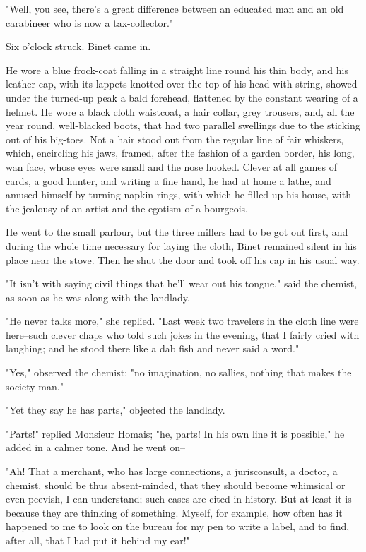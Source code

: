 \documentclass[11pt,twocolumn]{ltugboat}
\begin{document}
"Well, you see, there's a great difference between an educated man and
an old carabineer who is now a tax-collector."

Six o'clock struck. Binet came in.

He wore a blue frock-coat falling in a straight line round his thin
body, and his leather cap, with its lappets knotted over the top of
his head with string, showed under the turned-up peak a bald forehead,
flattened by the constant wearing of a helmet. He wore a black cloth
waistcoat, a hair collar, grey trousers, and, all the year round,
well-blacked boots, that had two parallel swellings due to the sticking
out of his big-toes. Not a hair stood out from the regular line of fair
whiskers, which, encircling his jaws, framed, after the fashion of a
garden border, his long, wan face, whose eyes were small and the nose
hooked. Clever at all games of cards, a good hunter, and writing a
fine hand, he had at home a lathe, and amused himself by turning napkin
rings, with which he filled up his house, with the jealousy of an artist
and the egotism of a bourgeois.

He went to the small parlour, but the three millers had to be got out
first, and during the whole time necessary for laying the cloth, Binet
remained silent in his place near the stove. Then he shut the door and
took off his cap in his usual way.

"It isn't with saying civil things that he'll wear out his tongue," said
the chemist, as soon as he was along with the landlady.

"He never talks more," she replied. "Last week two travelers in the
cloth line were here--such clever chaps who told such jokes in the
evening, that I fairly cried with laughing; and he stood there like a
dab fish and never said a word."

"Yes," observed the chemist; "no imagination, no sallies, nothing that
makes the society-man."

"Yet they say he has parts," objected the landlady.

"Parts!" replied Monsieur Homais; "he, parts! In his own line it is
possible," he added in a calmer tone. And he went on--

"Ah! That a merchant, who has large connections, a jurisconsult, a
doctor, a chemist, should be thus absent-minded, that they should become
whimsical or even peevish, I can understand; such cases are cited in
history. But at least it is because they are thinking of something.
Myself, for example, how often has it happened to me to look on the
bureau for my pen to write a label, and to find, after all, that I had
put it behind my ear!"
\end{document}
